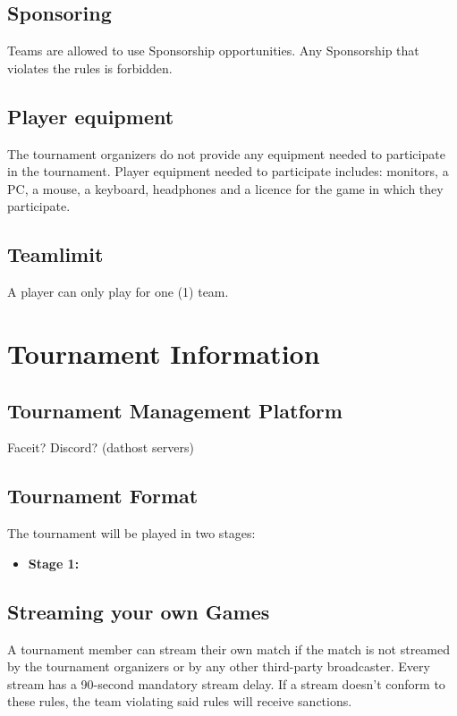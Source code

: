 \documentclass{article}
\begin{document}
\subsection{Sponsoring}
Teams are allowed to use Sponsorship opportunities. Any Sponsorship that violates the rules is forbidden.


\subsection{Player equipment}
The tournament organizers do not provide any equipment needed to participate in the tournament. Player equipment needed to participate 
includes: monitors, a PC, a mouse, a keyboard, headphones and a licence for the game in which they participate. 

\subsection{Teamlimit}
A player can only play for one (1) team. 



\section{Tournament Information}


\subsection{Tournament Management Platform}
Faceit?
Discord? (dathost servers)


\subsection{Tournament Format}

The tournament will be played in two stages:
\begin{itemize}
    \item \textbf{Stage 1:} 
\end{itemize}




\subsection{Streaming your own Games}
A tournament member can stream their own match if the match is not streamed by the tournament organizers or by any other third-party broadcaster. Every stream has a 90-second mandatory stream delay. If a stream doesn't conform to these rules, the team violating said
rules will receive sanctions. 
\end{document}
